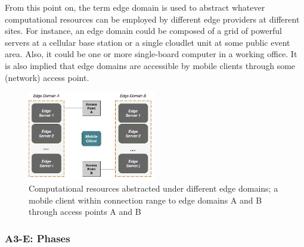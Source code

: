 From this point on, the term edge domain is used to abstract whatever computational resources can be employed by different edge providers at different sites. For instance, an edge domain could be composed of a grid of powerful servers at a cellular base station or a single cloudlet unit at some public event area. Also, it could be one or more single-board computer in a working office. It is also implied that edge domains are accessible by mobile clients through some (network) access point.

\begin{figure}
  \includegraphics[width=0.5\textwidth]{figs/edge-domain-client.png}
  \caption{Computational resources abstracted under different edge domains; a mobile client within connection range to edge domains A and B through access points A and B}
  \label{fig:edge-domain-client}
\end{figure}

\subsubsection{A3-E: Phases}

